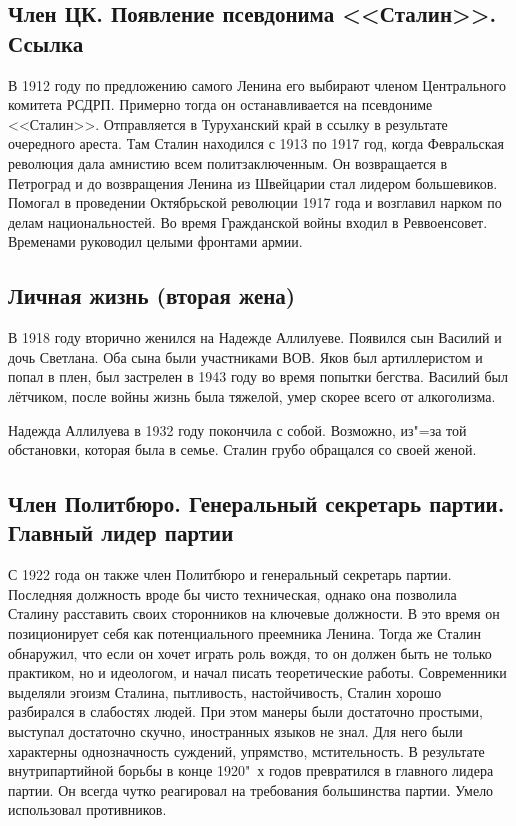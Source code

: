 \subsection{Член ЦК. Появление псевдонима <<Сталин>>. Ссылка}

В 1912 году по предложению самого Ленина его выбирают членом Центрального комитета РСДРП. Примерно тогда он останавливается на псевдониме <<Сталин>>. Отправляется в Туруханский край в ссылку в результате очередного ареста. Там Сталин находился с 1913 по 1917 год, когда Февральская революция дала амнистию всем политзаключенным. Он возвращается в Петроград и до возвращения Ленина из Швейцарии стал лидером большевиков. Помогал в проведении Октябрьской революции 1917 года и возглавил нарком по делам национальностей. Во время Гражданской войны входил в Реввоенсовет. Временами руководил целыми фронтами армии. 

\subsection{Личная жизнь (вторая жена)}

В 1918 году вторично женился на Надежде Аллилуеве. Появился сын Василий и дочь Светлана. Оба сына были участниками ВОВ. Яков был артиллеристом и попал в плен, был застрелен в 1943 году во время попытки бегства. Василий был лётчиком, после войны жизнь была тяжелой, умер скорее всего от алкоголизма.

Надежда Аллилуева в 1932 году покончила с собой. Возможно, из"=за той обстановки, которая была в семье. Сталин грубо обращался со своей женой.

\subsection{Член Политбюро. Генеральный секретарь партии. Главный лидер партии}

С 1922 года он также член Политбюро и генеральный секретарь партии. Последняя должность вроде бы чисто техническая, однако она позволила Сталину расставить своих сторонников на ключевые должности. В это время он позиционирует себя как потенциального преемника Ленина. Тогда же Сталин обнаружил, что если он хочет играть роль вождя, то он должен быть не только практиком, но и идеологом, и начал писать теоретические работы. Современники выделяли эгоизм Сталина, пытливость, настойчивость, Сталин хорошо разбирался в слабостях людей. При этом манеры были достаточно простыми, выступал достаточно скучно, иностранных языков не знал. Для него были характерны однозначность суждений, упрямство, мстительность. В результате внутрипартийной борьбы в конце 1920"~х годов превратился в главного лидера партии. Он всегда чутко реагировал на требования большинства партии. Умело использовал противников.

